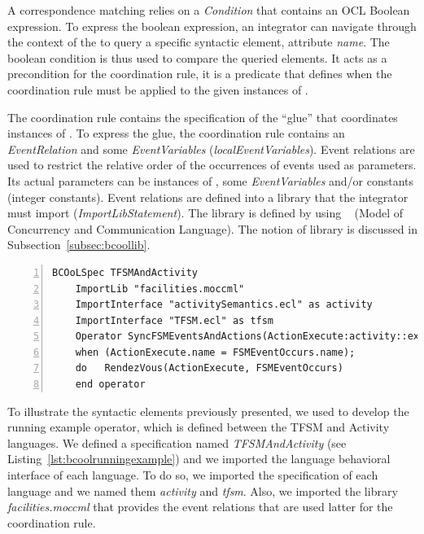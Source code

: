 A correspondence matching relies on a \emph{Condition} that contains an OCL Boolean expression. To express the boolean expression, an integrator can navigate through the context of the \dse to query a specific syntactic element, \eg attribute \emph{name}. The boolean condition is thus used to compare the queried elements. It acts as a precondition for the coordination rule, \ie it is a predicate that defines when the coordination rule must be applied to the given instances of \dse.

The coordination rule contains the specification of the ``glue'' that coordinates instances of \dse. To express the glue, the coordination rule contains an \emph{EventRelation} and some \emph{EventVariables} (\emph{localEventVariables}). Event relations are used to restrict the relative order of the occurrences of events used as parameters. Its actual parameters can be instances of \dse, some \emph{EventVariables} and/or constants (\eg integer constants). Event relations are defined into a library that the integrator must import (\emph{ImportLibStatement}). The library is defined by using \moccml~\cite{moccmlbib} (Model of Concurrency and Communication Language). The notion of library is discussed in Subsection~\ref{subsec:bcoollib}.

	\begin{lstlisting}[language=bcool,
	caption={Running example operator between the TFSM and Activity languages},
	label={lst:bcoolrunningexample}, 
	basicstyle=\scriptsize\ttfamily, backgroundcolor=\color{LGrey}, numbers=left, xleftmargin=2pt]
	BCOoLSpec TFSMAndActivity
	ImportLib "facilities.moccml"
	ImportInterface "activitySemantics.ecl" as activity
	ImportInterface "TFSM.ecl" as tfsm
	Operator SyncFSMEventsAndActions(ActionExecute:activity::executeIt, FSMEventOccurs:tfsm::occurs)
	when (ActionExecute.name = FSMEventOccurs.name);
	do   RendezVous(ActionExecute, FSMEventOccurs)
	end operator
	\end{lstlisting}

To illustrate the syntactic elements previously presented, we used \bcool to develop the running example operator, which is defined between the TFSM and Activity languages. We defined a \bcool specification named \emph{TFSMAndActivity} (see Listing~\ref{lst:bcoolrunningexample}) and we imported the language behavioral interface of each language. To do so, we imported the \ecl specification of each language and we named them \emph{activity} and \emph{tfsm}. Also, we imported the \moccml library \emph{facilities.moccml} that provides the event relations that are used latter for the coordination rule. 

